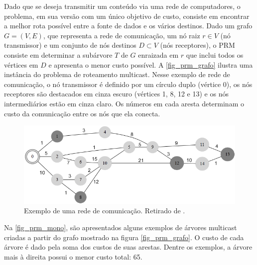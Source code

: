 Dado que se deseja transmitir um conteúdo via uma rede de computadores, o problema, em sua versão com um único objetivo de custo, consiste em encontrar a melhor rota possível entre a fonte de dados e os vários destinos. Dado um grafo $G=(V,E)$, que representa a rede de comunicação, um nó raiz $r \in V$ (nó transmissor) e um conjunto de nós destinos $D \subset V$ (nós receptores), o PRM consiste em determinar a subárvore $T$ de $G$ enraizada em $r$ que inclui todos os vértices em $D$ e apresenta o menor custo possível. A \autoref{fig_prm_grafo} ilustra uma instância do problema de roteamento multicast. Nesse exemplo de rede de comunicação, o nó transmissor é definido por um círculo duplo (vértice 0), os nós receptores são destacados em cinza escuro (vértices 1, 8, 12 e 13) e os nós intermediários estão em cinza claro. Os números em cada aresta determinam o custo da comunicação entre os nós que ela conecta.

\begin{figure}[!htbp]
	\centering
	\includegraphics[width=1\textwidth]{cap_problemas/figs/prm_grafo}
	\caption{\label{fig_prm_grafo}Exemplo de uma rede de comunicação. Retirado de \cite{BuenoThesis}.}
\end{figure}

Na \autoref{fig_prm_mono}, são apresentados alguns exemplos de árvores multicast criadas a partir do grafo mostrado na figura \autoref{fig_prm_grafo}. O custo de cada árvore é dado pela soma dos custos de suas arestas. Dentre os exemplos, a árvore mais à direita possui o menor custo total: 65.

